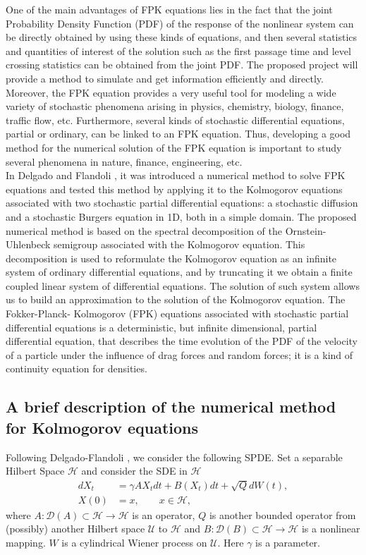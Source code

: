 \documentclass{article}
\numberwithin{equation}{section}
\begin{document}
One of the main advantages of FPK equations lies in the fact that the joint Probability Density Function (PDF) of the response of the
nonlinear system can be directly obtained by using these kinds of equations, and then several statistics
and quantities of interest of the solution such as the first passage time and level crossing statistics can
be obtained from the joint PDF. The proposed project will provide a method to simulate and get
information efficiently and directly. Moreover, the FPK equation provides a very useful tool for
modeling a wide variety of stochastic phenomena arising in physics, chemistry, biology, finance,
traffic flow, etc. Furthermore, several kinds of stochastic differential equations, partial or ordinary,
can be linked to an FPK equation. Thus, developing a good method for the numerical solution of the
FPK equation is important to study several phenomena in nature, finance, engineering, etc.\\

In Delgado and Flandoli \cite{de-fl}, it was introduced a numerical method to solve FPK equations and tested this
method by applying it to the Kolmogorov equations associated with two stochastic partial differential
equations: a stochastic diffusion and a stochastic Burgers equation in 1D, both in a simple domain. The
proposed numerical method is based on the spectral decomposition of the Ornstein-Uhlenbeck
semigroup associated with the Kolmogorov equation. This decomposition is used to reformulate the
Kolmogorov equation as an infinite system of ordinary differential equations, and by truncating it we
obtain a finite coupled linear system of differential equations. The solution of such system allows us to
build an approximation to the solution of the Kolmogorov equation. The Fokker-Planck-
Kolmogorov (FPK) equations associated with stochastic partial differential equations
is a deterministic, but infinite dimensional, partial differential equation, that describes
the time evolution of the PDF of the velocity of a particle under the influence
of drag forces and random forces; it is a kind of continuity equation for densities.\\

\subsection{A brief description of the numerical method for Kolmogorov equations}\label{num-kol-sect}
Following Delgado-Flandoli \cite{de-fl}, we consider the following SPDE. 
Set a separable Hilbert Space $\mathcal{H}$  and consider the SDE in $\mathcal{H}$
\begin{align}
 dX_t&=\gamma AX_tdt+B(X_t)dt+\sqrt{Q}dW(t),\label{P1s2.1}\\
X(0)&=x, \qquad x\in\mathcal{H},\nonumber
\end{align}
where  $A:\mathcal{D}(A)\subset \mathcal{H}\rightarrow \mathcal{H}$ is an  operator, $Q$ is another bounded operator from (possibly) another
Hilbert space $\mathcal{U}$ to $\mathcal{H}$ and $B:\mathcal{D}(B)\subset \mathcal{H}\rightarrow \mathcal{H}$ is a nonlinear mapping. 
$W$ is a cylindrical Wiener process on $\mathcal{U}$. Here $\gamma$ is a parameter.
\end{document}
